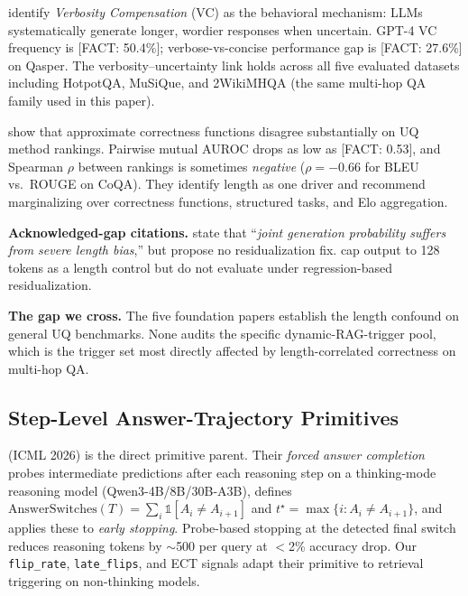 \documentclass[11pt]{article}
\newcommand{\FACT}[1]{{\color{blue}\textsf{[FACT: #1]}}}
\begin{document}
\cite{Zhang_VerbosityVeracityVCBehavior} identify \emph{Verbosity Compensation}
(VC) as the behavioral mechanism: LLMs systematically generate longer, wordier
responses when uncertain. GPT-4 VC frequency is \FACT{50.4\%}; verbose-vs-concise
performance gap is \FACT{27.6\%} on Qasper. The verbosity--uncertainty link
holds across all five evaluated datasets including HotpotQA, MuSiQue, and
2WikiMHQA (the same multi-hop QA family used in this paper).

\cite{Ielanskyi_PitfallsUQEvaluationNLG} show that approximate correctness
functions disagree substantially on UQ method rankings. Pairwise mutual AUROC
drops as low as \FACT{0.53}, and Spearman $\rho$ between rankings is sometimes
\emph{negative} ($\rho = -0.66$ for BLEU vs.\ ROUGE on CoQA). They identify
length as one driver and recommend marginalizing over correctness functions,
structured tasks, and Elo aggregation.

\noindent\textbf{Acknowledged-gap citations.}
\cite{Mao_ConfidenceOverTimeSTL} state that ``\textit{joint generation
probability suffers from severe length bias},'' but propose no
residualization fix. \cite{Chen_DynamicInstabilityLLMReasoning} cap output to
128 tokens as a length control but do not evaluate under regression-based
residualization.

\noindent\textbf{The gap we cross.} The five foundation papers establish the
length confound on general UQ benchmarks. None audits the specific
dynamic-RAG-trigger pool, which is the trigger set most directly affected by
length-correlated correctness on multi-hop QA.

\subsection{Step-Level Answer-Trajectory Primitives}
\label{sec:related-answer-trajectory}

\cite{Datta_DecideEarlyExplainLater} (ICML 2026) is the direct primitive
parent. Their \emph{forced answer completion} probes intermediate predictions
after each reasoning step on a thinking-mode reasoning model
(Qwen3-4B/8B/30B-A3B), defines
$\mathrm{AnswerSwitches}(T) = \sum_i \mathbb{1}[A_i \neq A_{i+1}]$ and
$t^\star = \max\{i : A_i \neq A_{i+1}\}$, and applies these to
\emph{early stopping}. Probe-based stopping at the detected final switch
reduces reasoning tokens by $\sim$500 per query at $<$2\% accuracy drop. Our
\texttt{flip\_rate}, \texttt{late\_flips}, and ECT signals adapt
their primitive to retrieval triggering on non-thinking models.
\end{document}
